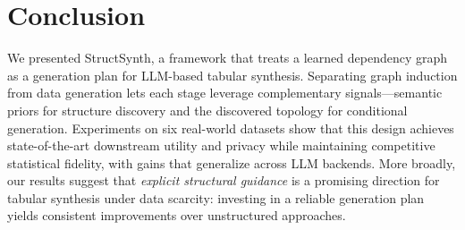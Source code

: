 \section{Conclusion}

We presented \textsf{StructSynth}, a framework that treats a learned dependency graph as a generation plan for LLM-based tabular synthesis. Separating graph induction from data generation lets each stage leverage complementary signals---semantic priors for structure discovery and the discovered topology for conditional generation.
Experiments on six real-world datasets show that this design achieves state-of-the-art downstream utility and privacy while maintaining competitive statistical fidelity, with gains that generalize across LLM backends.
More broadly, our results suggest that \emph{explicit structural guidance} is a promising direction for tabular synthesis under data scarcity: investing in a reliable generation plan yields consistent improvements over unstructured approaches.
